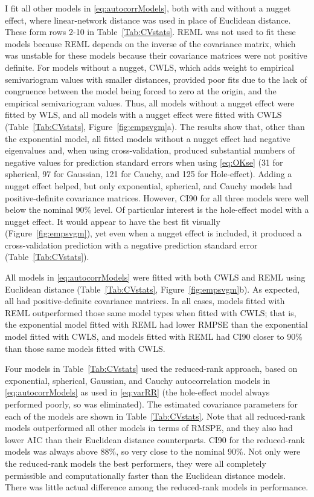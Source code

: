 \documentclass[11pt, titlepage]{article}\usepackage[]{graphicx}\usepackage[]{color}
\begin{document}
\begin{spacing}{1.9}
\begin{flushleft}
I fit all other models in \ref{eq:autocorrModels}, both with and without a nugget effect, where linear-network distance was used in place of Euclidean distance.  These form rows 2-10 in Table~\ref{Tab:CVstats}. REML was not used to fit these models because REML depends on the inverse of the covariance matrix, which was unstable for these models because their covariance matrices were not positive definite. For models without a nugget, CWLS, which adds weight to empirical semivariogram values with smaller distances, provided poor fits due to the lack of congruence between the model being forced to zero at the origin, and the empirical semivariogram values.  Thus, all models without a nugget effect were fitted by WLS, and all models with a nugget effect were fitted with CWLS (Table~\ref{Tab:CVstats}, Figure~\ref{fig:empsvgm}a). The results show that, other than the exponential model, all fitted models without a nugget effect had negative eigenvalues and, when using cross-validation, produced substantial numbers of negative values for prediction standard errors when using \ref{eq:OKse} (31 for spherical, 97 for Gaussian, 121 for Cauchy, and 125 for Hole-effect).  Adding a nugget effect helped, but only exponential, spherical, and Cauchy models had positive-definite covariance matrices.  However, CI90 for all three models were well below the nominal 90\% level.  Of particular interest is the hole-effect model with a nugget effect. It would appear to have the best fit visually (Figure~\ref{fig:empsvgm}), yet even when a nugget effect is included, it produced a cross-validation prediction with a negative prediction standard error (Table~\ref{Tab:CVstats}).

All models in \ref{eq:autocorrModels} were fitted with both CWLS and REML using Euclidean distance (Table~\ref{Tab:CVstats}, Figure~\ref{fig:empsvgm}b).  As expected, all had positive-definite covariance matrices.  In all cases, models fitted with REML outperformed those same model types when fitted with CWLS; that is, the exponential model fitted with REML had lower RMPSE than the exponential model fitted with CWLS, and models fitted with REML had CI90 closer to 90\% than those same models fitted with CWLS.

Four models in Table~\ref{Tab:CVstats} used the reduced-rank approach, based on exponential, spherical, Gaussian, and Cauchy autocorrelation models in \ref{eq:autocorrModels} as used in \ref{eq:varRR} (the hole-effect model always performed poorly, so was eliminated).  The estimated covariance parameters for each of the models are shown in Table~\ref{Tab:CVstats}.  Note that all reduced-rank models outperformed all other models in terms of RMSPE, and they also had lower AIC than their Euclidean distance counterparts.  CI90 for the reduced-rank models was always above 88\%, so very close to the nominal 90\%. Not only were the reduced-rank models the best performers, they were all completely permissible and computationally faster than the Euclidean distance models.  There was little actual difference among the reduced-rank models in performance.  


\end{flushleft}
\end{spacing}
\end{document}
